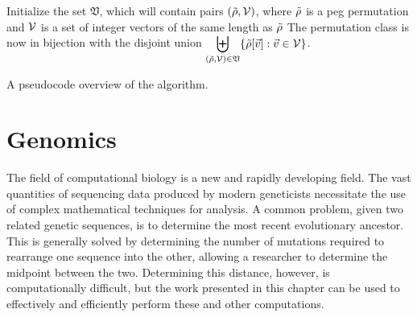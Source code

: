  \SetAlFnt{\small\ttfamily}
  \begin{algorithm}
    \DontPrintSemicolon



    Initialize the set $\mathfrak{V}$, which will contain pairs $(\tilde{\rho},
    \mathcal{V})$, where $\tilde{\rho}$ is a peg permutation and $\mathcal{V}$ is a set of
    integer vectors of the same length as $\tilde{\rho}$\;
    The permutation class is now in bijection with the disjoint union
    $\displaystyle\biguplus_{(\tilde{\rho},\mathcal{V}) \in \mathfrak{V}} \{
      \tilde{\rho}[\vec{v}] : \vec{v} \in \mathcal{V} \}$.\; 
  \SetAlFnt{\normalsize\sffamily}
  \caption{A pseudocode overview of the algorithm.}
  \label{polyclass:fig:pseudocode}
  \end{algorithm}



\section{Genomics}
\label{polyclass:sec:data}

  The field of computational biology is a new and rapidly developing field.
  The vast quantities of sequencing data produced by modern geneticists
  necessitate the use of complex mathematical techniques for analysis.
  A common problem, given two related genetic sequences, is to determine the
  most recent evolutionary ancestor. This is generally solved by determining
  the number of mutations required to rearrange one sequence into the other,
  allowing a researcher to determine the midpoint between the two. Determining
  this distance, however, is computationally difficult, but the work presented
  in this chapter can be used to effectively and efficiently perform these and
  other computations. 
  
